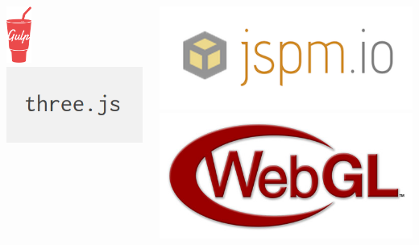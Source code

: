 \documentclass[aspectratio=169]{beamer}
\newenvironment{myframe}[1][t]{\begin{frame}[#1]{\secname}{\subsecname}}{\end{frame}}
\begin{document}
\begin{myframe}
\begin{columns}[t]
\begin{column}{0.3 \linewidth}
				\includegraphics[height=5em]{images/technologies/gulp} 				
				\\[2em]
				\centering
				\includegraphics[width=0.85\linewidth]{images/technologies/threejs}
			\end{column}
			\begin{column}{0.3 \linewidth}
				\includegraphics[width=\linewidth]{images/technologies/jspm}		  \\[2em]
				\includegraphics[width=\linewidth]{images/technologies/webgl}
			\end{column}
		\end{columns}
	\end{myframe}
	
\end{document}
